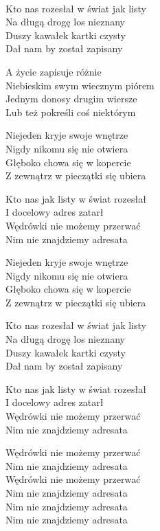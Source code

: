 \begin{text}
\vin\\
Kto nas rozesłał w świat jak listy\\
Na długą drogę los nieznany\\
Duszy kawałek kartki czysty\\
Dał nam by został zapisany

A życie zapisuje różnie\\
Niebieskim swym wiecznym piórem\\
Jednym donosy drugim wiersze\\
Lub też pokreśli coś niektórym

\vin Niejeden kryje swoje wnętrze\\
\vin Nigdy nikomu się nie otwiera\\
\vin Głęboko chowa się w kopercie\\
\vin Z zewnątrz w pieczątki się ubiera

Kto nas jak listy w świat rozesłał\\
I docelowy adres zatarł\\
Wędrówki nie możemy przerwać\\
Nim nie znajdziemy adresata

\vin Niejeden kryje swoje wnętrze\\
\vin Nigdy nikomu się nie otwiera\\
\vin Głęboko chowa się w kopercie\\
\vin Z zewnątrz w pieczątki się ubiera

Kto nas rozesłał w świat jak listy\\
Na długą drogę los nieznany\\
Duszy kawałek kartki czysty\\
Dał nam by został zapisany

\vin Kto nas jak listy w świat rozesłał\\
\vin I docelowy adres zatarł\\
\vin Wędrówki nie możemy przerwać\\
\vin Nim nie znajdziemy adresata

Wędrówki nie możemy przerwać\\
Nim nie znajdziemy adresata\\
Wędrówki nie możemy przerwać\\
Nim nie znajdziemy adresata\\
Nim nie znajdziemy adresata\\
Nim nie znajdziemy adresata
\end{text}
